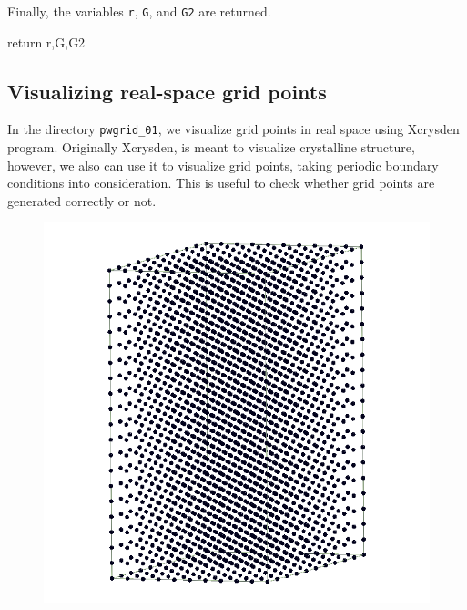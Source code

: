 Finally, the variables \verb|r|, \verb|G|, and \verb|G2| are returned.

\begin{juliacode}
  return r,G,G2
\end{juliacode}


\subsection{Visualizing real-space grid points}

In the directory \verb|pwgrid_01|, we visualize grid points in real space
using Xcrysden program. Originally Xcrysden, is meant to visualize crystalline structure,
however, we also can use it to visualize grid points, taking periodic boundary
conditions into consideration.
This is useful to check whether grid points are generated correctly or not.

\begin{figure}
\centering
\includegraphics[scale=0.25]{images/R_grid_hexagonal.png}
\par
\end{figure}

